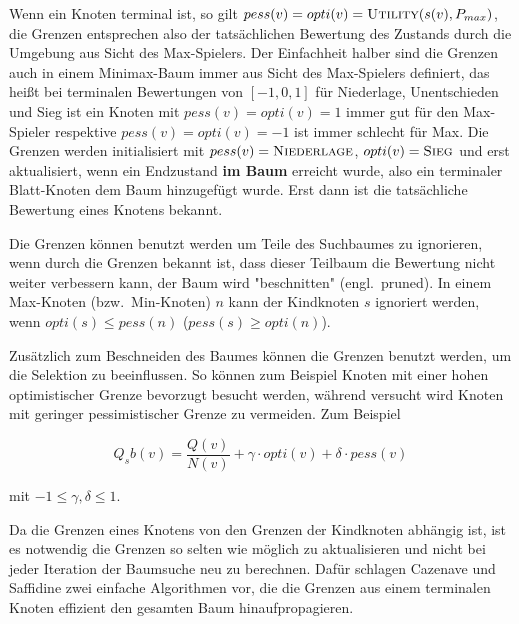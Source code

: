 Wenn ein Knoten terminal ist, so gilt $pess(v) = opti(v) = \textsc{Utility}(s(v),P_{max})$, die Grenzen entsprechen also der tatsächlichen Bewertung des Zustands durch die Umgebung aus Sicht des Max-Spielers. Der Einfachheit halber sind die Grenzen auch in einem Minimax-Baum immer aus Sicht des Max-Spielers definiert, das heißt bei terminalen Bewertungen von $[-1, 0, 1]$ für Niederlage, Unentschieden und Sieg ist ein Knoten mit $pess(v) = opti(v) = 1$ immer gut für den Max-Spieler respektive $pess(v) = opti(v) = -1$ ist immer schlecht für Max. Die Grenzen werden initialisiert mit $pess(v) = \textsc{Niederlage}$, $opti(v) = \textsc{Sieg}$ und erst aktualisiert, wenn ein Endzustand \textbf{im Baum} erreicht wurde, also ein terminaler Blatt-Knoten dem Baum hinzugefügt wurde.
Erst dann ist die tatsächliche Bewertung eines Knotens bekannt.

Die Grenzen können benutzt werden um Teile des Suchbaumes zu ignorieren, wenn durch die Grenzen bekannt ist, dass dieser Teilbaum die Bewertung nicht weiter verbessern kann, der Baum wird "beschnitten" (engl.\ pruned).
In einem Max-Knoten (bzw.\ Min-Knoten) $n$ kann der Kindknoten $s$ ignoriert werden, wenn $opti(s) \le pess(n)$ ($pess(s) \ge opti(n)$).\autocite[\ppno~5]{cazenaveScoreBoundedMonteCarlo2011}

Zusätzlich zum Beschneiden des Baumes können die Grenzen benutzt werden, um die Selektion zu beeinflussen.
So können zum Beispiel Knoten mit einer hohen optimistischer Grenze bevorzugt besucht werden, während versucht wird Knoten mit geringer pessimistischer Grenze zu vermeiden.
Zum Beispiel

\begin{equation}
Q_sb(v) = \frac{Q(v)}{N(v)} + \gamma \cdot opti(v) + \delta \cdot pess(v)
\label{eqn:scorebound}
\end{equation}

mit $-1 \le \gamma, \delta \le 1$.

Da die Grenzen eines Knotens von den Grenzen der Kindknoten abhängig ist, ist es notwendig die Grenzen so selten wie möglich zu aktualisieren und nicht bei jeder Iteration der Baumsuche neu zu berechnen.
Dafür schlagen Cazenave und Saffidine zwei einfache Algorithmen vor, die die Grenzen aus einem terminalen Knoten effizient den gesamten Baum hinaufpropagieren.


